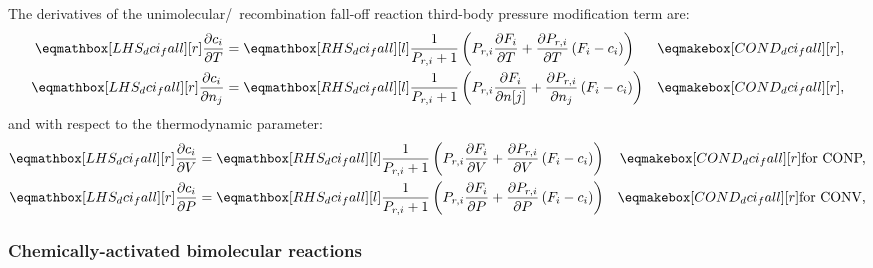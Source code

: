 \documentclass[12pt]{article}
\newcommand{\conp}{CONP}
\newcommand{\conv}{CONV}
\newcommand{\dconp}{\ifmmode\text{for \conp,}\else for \conp,\fi}
\newcommand{\dconv}{\ifmmode\text{for \conv,}\else for \conv,\fi}
\begin{document}
The derivatives of the unimolecular\slash~recombination fall-off reaction third-body pressure modification term are:
\begin{align}
 \label{e:dci_fall_dt}
 \lhs{dci_fall}{\frac{\partial c_{i} }{\partial T }} &= \rhs{dci_fall}{\frac{1}{P_{r, i} + 1} \left(P_{r, i} \frac{\partial F_{i} }{\partial T } + \frac{\partial P_{r, i} }{\partial T } \left(F_{i} - c_{i}\right)\right)} & \cond{dci_fall}{,}\\
 \label{e:dci_fall_dnj}
 \lhs{dci_fall}{\frac{\partial c_{i} }{\partial n_j}} &= \rhs{dci_fall}{\frac{1}{P_{r, i} + 1} \left(P_{r, i} \frac{\partial F_{i} }{\partial n[j] } + \frac{\partial P_{r, i} }{\partial n_j } \left(F_{i} - c_{i}\right)\right)} & \cond{dci_fall}{,}
\end{align}
and with respect to the thermodynamic parameter:
\begin{subequations}
 \label{e:dci_fall_de}
 \begin{align}
  \lhs{dci_fall}{\frac{\partial c_i }{\partial V }} &= \rhs{dci_fall}{\frac{1}{P_{r, i} + 1} \left(P_{r, i} \frac{\partial F_{i} }{\partial V } + \frac{\partial P_{r, i} }{\partial V } \left(F_{i} - c_{i}\right)\right)} & \cond{dci_fall}{\dconp} \\
  \lhs{dci_fall}{\frac{\partial c_i }{\partial P }} &= \rhs{dci_fall}{\frac{1}{P_{r, i} + 1} \left(P_{r, i} \frac{\partial F_{i} }{\partial P } + \frac{\partial P_{r, i} }{\partial P } \left(F_{i} - c_{i}\right)\right)} & \cond{dci_fall}{\dconv}
 \end{align}
\end{subequations}

\subsubsection{Chemically-activated bimolecular reactions}
\label{s:dchem}
\end{document}
